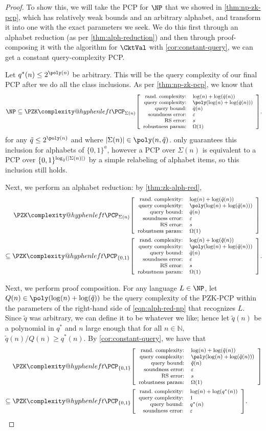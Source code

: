 \documentclass[english,12pt]{reedthesis}
\makeatletter
\theoremstyle{plain}
\theoremstyle{definition}
\theoremstyle{remark}
\DeclarePairedDelimiter{\abs}{\lvert}{\rvert}
\newcommand{\pzkpcp}[4]{%
  \ensuremath%
  \mleft[{\footnotesize\begin{array}{r l}
    \text{rand.\ complexity:} & #1 \\
    \text{query complexity:} & #2 \\
    \text{query bound:} & #3 \\
    \text{soundness error:} & #4
  \end{array}}\mright]%
}
\newcommand{\pzkpcpr}[6]{%
  \ensuremath%
  \mleft[{\footnotesize\begin{array}{r l}
    \text{rand.\ complexity:} & #1 \\
    \text{query complexity:} & #2 \\
    \text{query bound:} & #3 \\
    \text{soundness error:} & #4 \\
    \text{RS error:} & #5 \\
    \text{robustness param:} & #6
  \end{array}}\mright]%
}
\newcommand{\PZKPCP}{%
  \PZK\complexity@hyphenleft\PCP
}
\makeatother
\begin{document}
\begin{proof}
  To show this, we will take the PCP for $\NP$ that we showed in
  \cref{thm:np-zk-pcp}, which has relatively weak bounds and an arbitrary
  alphabet, and transform it into one with the exact parameters we seek. We do
  this first through an alphabet reduction (as per \cref{thm:alph-reduction})
  and then through proof-composing it with the algorithm for $\CktVal$ with
  \cref{cor:constant-query}, we can get a constant query-complexity PCP.

  Let $q^{*}(n) \le 2^{\poly(n)}$ be arbitrary. This will be the query complexity
  of our final PCP after we do all the class inclusions. As per
  \cref{thm:np-zk-pcp}, we know that
  \begin{equation}\label{eqn:np-subseteq-pzkpcp}
    \NP \subseteq
    \PZKPCP_{\Sigma(n)}\pzkpcpr{\log(n)+\log(\tilde{q}(n))}{\poly(\log(n) + \log(\tilde{q}(n)))}{\tilde{q}(n)}{\varepsilon}{s}{\Omega(1)}.
  \end{equation}
  for any $\tilde{q} \le 2^{\poly(n)}$ and where
  $\abs{\Sigma(n)} \in \poly(n, \tilde{q})$.  only guarantees this
  inclusion for alphabets of $\{0, 1\}^{a}$, however a PCP over $\Sigma(n)$ is
  equivalent to a PCP over $\{0, 1\}^{\log_{2}(\abs{\Sigma(n)})}$ by a simple
  relabeling of alphabet items, so this inclusion still holds.

  Next, we perform an alphabet reduction: by \cref{thm:zk-alph-red},
  \begin{equation}\label{eqn:alph-red-np}
    \begin{aligned}
      \PZKPCP_{\Sigma(n)}&\pzkpcpr{\log(n)+\log(\tilde{q}(n))}{\poly(\log(n) + \log(\tilde{q}(n)))}{\tilde{q}(n)}{\varepsilon}{s}{\Omega(1)} \\
      \subseteq \PZKPCP_{\{0,1\}}&\pzkpcpr{\log(n)+\log(\tilde{q}(n))}{\poly(\log(n) + \log(\tilde{q}(n)))}{\tilde{q}(n)}{\varepsilon}{s}{\Omega(1)}.
    \end{aligned}
  \end{equation}

  Next, we perform proof composition. For any language $L \in \NP$, let
  $Q(n) \in \poly(\log(n) + \log(\tilde{q}))$ be the query complexity of the
  PZK-PCP within the parameters of the right-hand side of \cref{eqn:alph-red-np}
  that recognizes $L$. Since $\tilde{q}$ was arbitrary, we can define it to be
  whatever we like; hence let $\tilde{q}(n)$ be a polynomial in $q^{*}$ and $n$
  large enough that for all $n \in \mathbb{N}$, $\tilde{q}(n)/Q(n) \ge q^{*}(n)$. By
  \cref{cor:constant-query}, we have that
  \begin{equation}\label{eqn:proof-comb-np}
    \begin{aligned}
      \PZKPCP_{\{0,1\}}&\pzkpcpr{\log(n)+\log(\tilde{q}(n))}{\poly(\log(n) + \log(\tilde{q}(n)))}{\tilde{q}(n)}{\varepsilon}{s}{\Omega(1)} \\
      \subseteq \PZKPCP_{\{0,1\}}&\pzkpcp{\log(n)+\log(q^{*}(n))}{1}{q^{*}(n)}{\varepsilon}.
    \end{aligned}
  \end{equation}


\end{proof}
\end{document}
